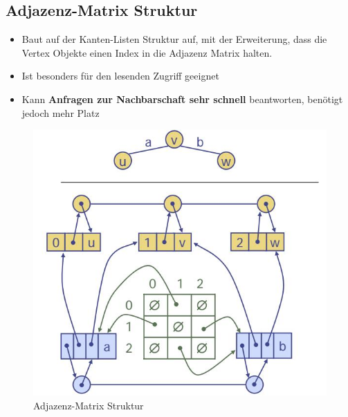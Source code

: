 \subsection{Adjazenz-Matrix Struktur}
\begin{itemize}
	\item Baut auf der Kanten-Listen Struktur auf, mit der Erweiterung, dass die Vertex Objekte einen Index in die Adjazenz Matrix halten.
	\item Ist besonders für den lesenden Zugriff geeignet
	\item Kann \textbf{Anfragen zur Nachbarschaft sehr schnell} beantworten, benötigt jedoch mehr Platz
\end{itemize}
\begin{figure}[h!]
\centering
\includegraphics[width=0.5\linewidth]{images/graph_adjazenz_matrix}
\caption{Adjazenz-Matrix Struktur}
\label{fig:graphadjazenzmatrix}
\end{figure}

